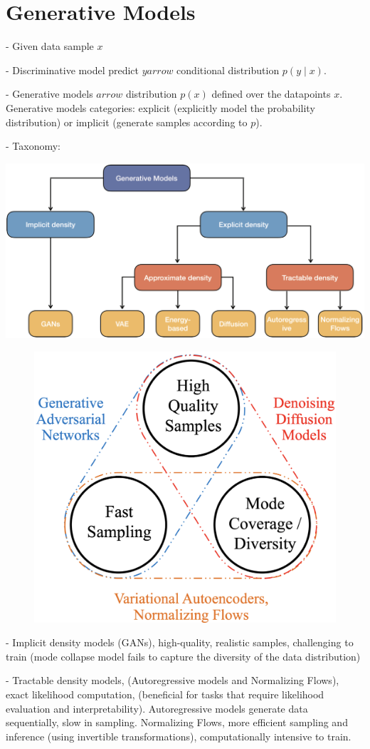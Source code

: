 \section*{Generative Models}

- Given data sample $x$ 

- Discriminative model predict $y arrow$ conditional distribution $p(y \mid x)$. 

- Generative models $arrow$ distribution $p(x)$ defined over the datapoints $x$. Generative models  categories: explicit (explicitly model the probability distribution) or implicit (generate samples according to $p$).

- Taxonomy: 

\includegraphics*[width=0.9\columnwidth]{figures/generative_taxonomy.png}

\begin{figure} 
    \centering
    \includegraphics[width=0.5\columnwidth]{figures/generative_pros_cons.png}
    \vspace{-10pt}
\end{figure}

- Implicit density models (GANs), high-quality, realistic samples, challenging to train (mode collapse model fails to capture the diversity of the data distribution)

- Tractable density models, (Autoregressive models and Normalizing Flows), exact likelihood computation, (beneficial for tasks that require likelihood evaluation and interpretability). Autoregressive models generate data sequentially, slow in sampling. Normalizing Flows, more efficient sampling and inference (using invertible transformations), computationally intensive to train.

